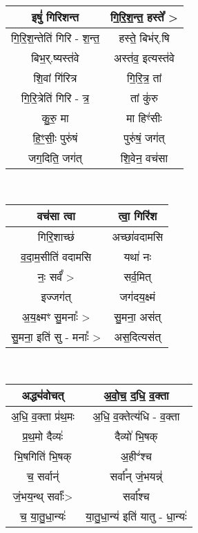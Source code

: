 {\centering
{\small {}} \\
\begin{longtable}{|c|c|}
\hline
इषुं॑ गिरिशन्त               & गि॒रि॒श॒न्त॒ हस्ते᳚ >\\
\hline
गि॒रि॒श॒न्तेति॑ गिरि - श॒न्त॒     & हस्ते॒ बिभ॑र्.षि\\
\hline
बिभ॒र्.ष्यस्त॑वे               & अस्त॑व॒ इत्यस्त॑वे\\
\hline
शि॒वां गि॑रित्र              & गि॒रि॒त्र॒ तां\\
\hline
गि॒रि॒त्रेति॑ गिरि - त्र॒       & तां कु॑रु\\
\hline
कु॒रु॒ मा                    & मा हिꣳ॑सीः\\
\hline
हि॒ꣳ॒सीः॒ पुरु॑षं               & पुरु॑षं॒ जग॑त्\\
\hline
जग॒दिति॒ जग॑त्               & शि॒वेन॒ वच॑सा\\
\hline
\end{longtable}
}
{\centering
{\small {}} \\
\begin{longtable}{|c|c|}
\hline
वच॑सा त्वा                 & त्वा॒ गिरि॑श\\
\hline
गिरि॒शाच्छ॑                 & अच्छा॑वदामसि\\
\hline
व॒दा॒म॒सीति॑ वदामसि          & यथा॑ नः\\
\hline
नः॒ सर्वं᳚ >                 & सर्व॒मित्\\
\hline
इज्जग॑त्                    & जग॑दय॒क्ष्मं\\
\hline
अ॒य॒क्ष्मꣳ सु॒मनाः᳚ >           & सु॒मना॒ अस॑त्\\
\hline
सु॒मना॒ इति॑ सु - मनाः᳚ >      & अस॒दित्यस॑त्\\
\hline
\end{longtable}
}
{\centering
{\small {}} \\
\begin{longtable}{|c|c|}
\hline
अद्ध्य॑वोचत्                 & अ॒वो॒च॒ द॒धि॒ व॒क्ता\\
\hline
अ॒धि॒ व॒क्ता प्र॑थ॒मः            & अ॒धि॒ व॒क्तेत्य॑धि - व॒क्ता\\
\hline
प्र॒थ॒मो दैव्यः॑               & दैव्यो॑ भि॒षक्\\
\hline
भि॒षगिति॑ भि॒षक्             & अ॒हीꣲ॑श्च\\
\hline
च॒ सर्वान्॑                  & सर्वा᳚न् जं॒भयन्न्॑\\
\hline
जं॒भय॒न्थ् सर्वाः᳚>             & सर्वा᳚श्च\\
\hline
च॒ या॒तु॒धा॒न्यः॑               & या॒तु॒धा॒न्य॑ इति॑ यातु - धा॒न्यः॑\\
\hline
\end{longtable}
}
